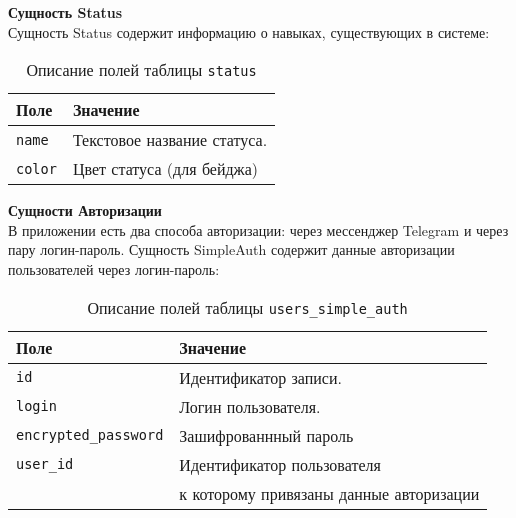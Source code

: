 \newpage
\noindent\textbf{Сущность Status}\\
Сущность Status содержит информацию о навыках, существующих в системе:
\begin{table}[!ht]
    \caption{Описание полей таблицы \texttt{status}}
    \label{tbl:status}
    \begin{center}
        \begin{tabular}{|p{}p{}|}
            \hline
            \textbf{Поле} & \textbf{Значение} \\\hline
            \texttt{name} & Текстовое название статуса. \\\hline
            \texttt{color} & Цвет статуса (для бейджа) \\\hline
        \end{tabular}
    \end{center}
\end{table}

\noindent\textbf{Сущности Авторизации}\\
В приложении есть два способа авторизации: через мессенджер Telegram\cite{telegram} и через пару логин-пароль.  
Сущность SimpleAuth содержит данные авторизации пользователей через логин-пароль:
\begin{table}[!ht]
    \caption{Описание полей таблицы \texttt{users\_simple\_auth}}
    \label{tbl:users_simple_auth}
    \begin{center}
        \begin{tabular}{|p{}p{}|}
            \hline
            \textbf{Поле} & \textbf{Значение} \\\hline
            \texttt{id} & Идентификатор записи. \\\hline
            \texttt{login} & Логин пользователя. \\\hline
            \texttt{encrypted\_password} & Зашифрованнный пароль \\\hline
            \texttt{user\_id} & Идентификатор пользователя \\ & к которому привязаны данные авторизации \\\hline
        \end{tabular}
    \end{center}
\end{table}

